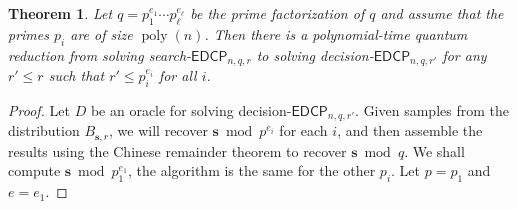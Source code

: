 \documentclass[11pt]{article}
\theoremstyle{plain}
\newtheorem{theorem}{Theorem}
\theoremstyle{definition}
\DeclareMathOperator{\poly}{poly}
\def\edcp{\ensuremath{\mathsf{EDCP}}}
\begin{document}
\begin{theorem}
    Let $q = p_1^{e_1} \cdots p_\ell^{e_\ell}$ be the prime factorization of $q$ and assume that the primes $p_i$ are of size $\poly(n)$. Then there is a polynomial-time quantum reduction from solving search-$\edcp_{n, q, r}$ to solving decision-$\edcp_{n, q, r'}$ for any $r' \le r$ such that $r' \le p_i^{e_i}$ for all $i$. 
\end{theorem}
\begin{proof}
    Let $D$ be an oracle for solving decision-$\edcp_{n, q, r'}$. Given samples from the distribution $B_{\bm{s}, r}$, we will recover $\bm{s} \bmod p^{e_i}$ for each $i$, and then assemble the results using the Chinese remainder theorem to recover $\bm{s} \bmod q$. We shall compute $\bm{s} \bmod p_1^{e_1}$, the algorithm is the same for the other $p_i$. Let $p = p_1$ and $e = e_1$.


\end{proof}
\end{document}
